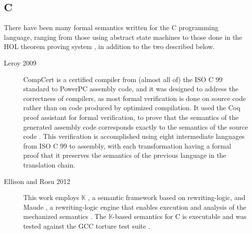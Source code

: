 \documentclass[a4paper,11pt,twoside]{report}
\begin{document}
\subsection{C}\label{sec:chist}
There have been many formal semantics written for the C programming language, ranging from those using abstract state machines \cite{Gurevich:1992} to those done in the HOL theorem proving system \cite{norrish:1998}, in addition to the two described below.
\begin{description}
\item[Leroy 2009] CompCert is a certified compiler from (almost all of) the ISO C 99 standard to PowerPC assembly code, and it was designed to address the correctness of compilers, as most formal verification is done on source code rather than on code produced by optimized compilation. It used the Coq proof assistant for formal verification, to prove that the semantics of the generated assembly code corresponds exactly to the semantics of the source code \cite{Leroy-Compcert-CACM}. This verification is accomplished using eight intermediate languages from ISO C 99 to assembly, with each transformation having a formal proof that it preserves the semantics of the previous language in the translation chain.

\item[Ellison and Rosu 2012] This work employs $\mathbb{K}$ \cite{rosu-serbanuta-2010-jlap}, a semantic framework based on rewriting-logic, and Maude \cite{Clavel:2007}, a rewriting-logic engine that enables execution and analysis of the mechanized semantics \cite{Ellison:2012}. The $\mathbb{K}$-based semantics for C is executable and was tested against the GCC torture test suite \cite{Ellison:2012}. 
\end{description}
\end{document}
